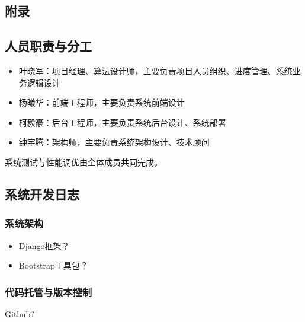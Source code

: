 \begin{center}
  \section{附录}
\end{center}

\subsection{人员职责与分工}
\begin{itemize}
  \item 叶晓军：项目经理、算法设计师，主要负责项目人员组织、进度管理、系统业务逻辑设计
  \item 杨曦华：前端工程师，主要负责系统前端设计
  \item 柯毅豪：后台工程师，主要负责系统后台设计、系统部署
  \item 钟宇腾：架构师，主要负责系统架构设计、技术顾问
\end{itemize}
系统测试与性能调优由全体成员共同完成。

\subsection{系统开发日志}
\subsubsection{系统架构}
\begin{itemize}
  \item Django框架？
  \item Bootstrap工具包？
\end{itemize}
\subsubsection{代码托管与版本控制}
Github?

